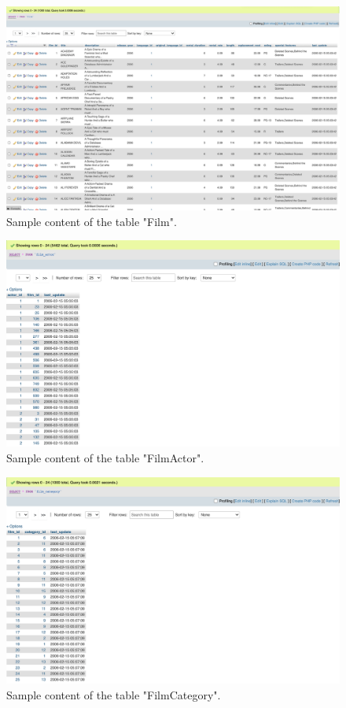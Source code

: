 \documentclass{article}
\begin{document}
		\begin{figure}[H]
			\includegraphics[width=\textwidth]{film_content}
			\caption{Sample content of the table "Film".}
		\end{figure}
		\begin{figure}[H]
			\includegraphics[width=\textwidth]{filmactor_content}
			\caption{Sample content of the table "Film\textunderscore Actor".}
		\end{figure}
		\begin{figure}[H]
			\includegraphics[width=\textwidth]{filmcategory_content}
			\caption{Sample content of the table "Film\textunderscore Category".}
		\end{figure}
\end{document}
